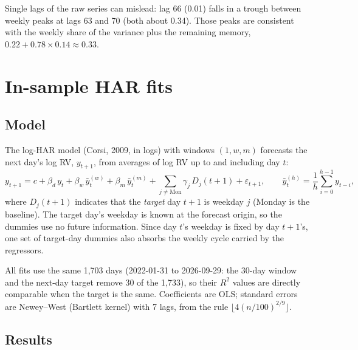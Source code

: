 \documentclass[11pt]{article}
\numberwithin{equation}{section}
\begin{document}
\noindent Single lags of the raw series can mislead: lag 66 (0.01) falls in a trough between weekly peaks at lags 63 and 70 (both about 0.34). Those peaks are consistent with the weekly share of the variance plus the remaining memory, $0.22 + 0.78 \times 0.14 \approx 0.33$.

\section{In-sample HAR fits}

\subsection{Model}

The log-HAR model (Corsi, 2009, in logs) with windows $(1, w, m)$ forecasts the next day's log RV, $y_{t+1}$, from averages of log RV up to and including day $t$:
\begin{equation}
y_{t+1} = c + \beta_d\, y_t + \beta_w\, \bar y^{(w)}_t + \beta_m\, \bar y^{(m)}_t + \sum_{j \neq \text{Mon}} \gamma_j\, D_j(t+1) + \varepsilon_{t+1},
\qquad \bar y^{(h)}_t = \frac1h \sum_{i=0}^{h-1} y_{t-i},
\end{equation}
where $D_j(t+1)$ indicates that the \emph{target} day $t+1$ is weekday $j$ (Monday is the baseline). The target day's weekday is known at the forecast origin, so the dummies use no future information. Since day $t$'s weekday is fixed by day $t+1$'s, one set of target-day dummies also absorbs the weekly cycle carried by the regressors.

All fits use the same 1,703 days (2022-01-31 to 2026-09-29: the 30-day window and the next-day target remove 30 of the 1,733), so their $R^2$ values are directly comparable when the target is the same. Coefficients are OLS; standard errors are Newey--West (Bartlett kernel) with 7 lags, from the rule $\lfloor 4 (n/100)^{2/9} \rfloor$.

\subsection{Results}
\end{document}
